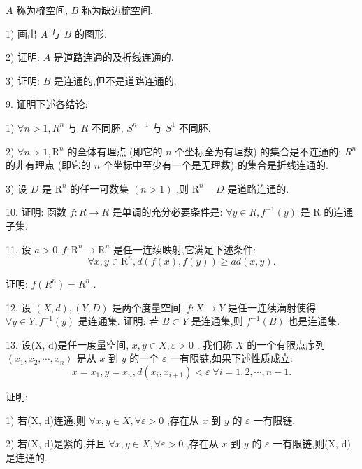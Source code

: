 $A$ 称为梳空间, $B$ 称为缺边梳空间.

1) 画出 $A$ 与 $B$ 的图形.

2) 证明: $A$ 是道路连通的及折线连通的.

3) 证明: $B$ 是连通的,但不是道路连通的.

9. 证明下述各结论:

1) $\forall n > 1,{R}^{n}$ 与 $R$ 不同胚, ${S}^{n - 1}$ 与 ${S}^{1}$ 不同胚.

2) $\forall n > 1,{\mathrm{R}}^{n}$ 的全体有理点 (即它的 $n$ 个坐标全为有理数) 的集合是不连通的; ${R}^{n}$ 的非有理点 (即它的 $n$ 个坐标中至少有一个是无理数) 的集合是折线连通的.

3) 设 $D$ 是 ${\mathrm{R}}^{n}$ 的任一可数集 $\left( {n > 1}\right)$ ,则 ${\mathrm{R}}^{n} - D$ 是道路连通的.

10. 证明: 函数 $f : R \rightarrow  R$ 是单调的充分必要条件是: $\forall y \in  R,{f}^{-1}\left( y\right)$ 是 $\mathrm{R}$ 的连通子集.

11. 设 $a > 0,f : {\mathrm{R}}^{n} \rightarrow  {\mathrm{R}}^{n}$ 是任一连续映射,它满足下述条件:
$$\forall x,y \in  {\mathrm{R}}^{n},d\left( {f\left( x\right) ,f\left( y\right) }\right)  \geq  {ad}\left( {x,y}\right) .$$

证明: $f\left( {R}^{n}\right)  = {R}^{n}$ .

12. 设 $\left( {X,d}\right) ,\left( {Y,D}\right)$ 是两个度量空间, $f : X \rightarrow  Y$ 是任一连续满射使得 $\forall y \in  Y,{f}^{-1}\left( y\right)$ 是连通集. 证明: 若 $B \subset  Y$ 是连通集,则 ${f}^{-1}\left( B\right)$ 也是连通集.

13. 设(X, d)是任一度量空间, $x,y \in  X,\varepsilon  > 0$ . 我们称 $X$ 的一个有限点序列 $\left\langle  {{x}_{1},{x}_{2},\cdots ,{x}_{n}}\right\rangle$ 是从 $x$ 到 $y$ 的一个 $\varepsilon$ 一有限链,如果下述性质成立:
$$x = {x}_{1},y = {x}_{n},d\left( {{x}_{i},{x}_{i + 1}}\right)  < \varepsilon \;\forall i = 1,2,\cdots ,n - 1.$$

证明:

1) 若(X, d)连通,则 $\forall x,y \in  X,\forall \varepsilon  > 0$ ,存在从 $x$ 到 $y$ 的 $\varepsilon$ 一有限链.

2) 若(X, d)是紧的,并且 $\forall x,y \in  X,\forall \varepsilon  > 0$ ,存在从 $x$ 到 $y$ 的 $\varepsilon$ 一有限链,则(X, d)是连通的.
